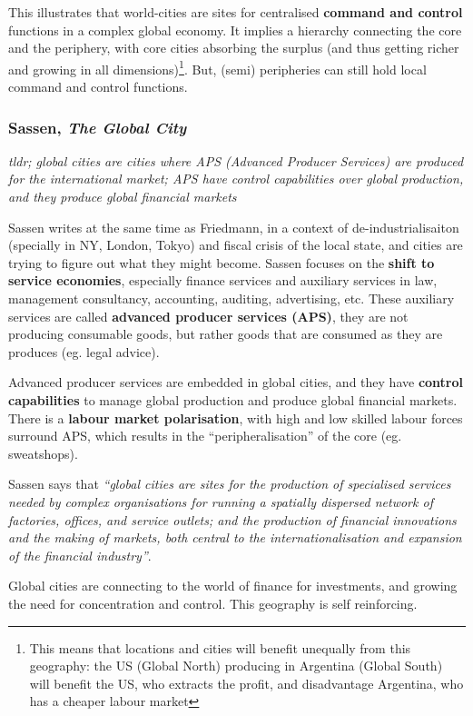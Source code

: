 \documentclass{article}
\begin{document}
This illustrates that world-cities are sites for centralised \textbf{command and control} functions in a complex global economy. It implies a hierarchy connecting the core and the periphery, with core cities absorbing the surplus (and thus getting richer and growing in all dimensions)\footnote{This means that locations and cities will benefit unequally from this geography: the US (Global  North) producing in Argentina (Global South) will benefit the US, who extracts the profit, and disadvantage Argentina, who has a cheaper labour market}. But, (semi) peripheries can still hold local command and control functions.

\subsubsection{Sassen, \textit{The Global City}}

\textit{tldr; global cities are cities where APS (Advanced Producer Services) are produced for the international market; APS have control capabilities over global production, and they produce global financial markets}

Sassen writes at the same time as Friedmann, in a context of de-industrialisaiton (specially in NY, London, Tokyo) and fiscal crisis of the local state, and cities are trying to figure out what they might become.
Sassen focuses on the \textbf{shift to service economies}, especially finance services and auxiliary services in law, management consultancy, accounting, auditing, advertising, etc. These auxiliary services are called \textbf{advanced producer services (APS)}, they are not producing consumable goods, but rather goods that are consumed as they are produces (eg. legal advice).

Advanced producer services are embedded in global cities, and they have \textbf{control capabilities} to manage global production and produce global financial markets. There is a \textbf{labour market polarisation}, with high and low skilled labour forces surround APS, which results in the ``peripheralisation'' of the core (eg. sweatshops).

Sassen says that \textit{``global cities are sites for the production of specialised services needed by complex organisations for running a spatially dispersed network of factories, offices, and service outlets; and the production of financial innovations and the making of markets, both central to the internationalisation and expansion of the financial industry''}.

Global cities are connecting to the world of finance for investments, and growing the need for concentration and control. This geography is self reinforcing.
\end{document}
